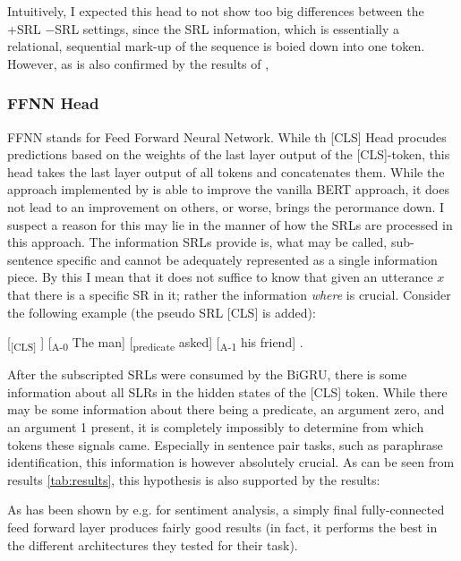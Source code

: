 Intuitively, I expected this head to not show too big differences between the +SRL $-$SRL settings,
since the SRL information, which is essentially a relational, sequential mark-up of the sequence is
boied down into one token. However, as is also confirmed by the results of \cite{zhang2019semantics},


\subsubsection{FFNN Head}

FFNN stands for Feed Forward Neural Network. While th [CLS] Head procudes predictions based on the
weights of the last layer output of the [CLS]-token, this head takes the last layer output of all
tokens and concatenates them.
While the approach implemented by \cite{zhang2019semantics} is able to improve the vanilla
BERT approach, it does not lead to an improvement on others, or worse, brings the perormance
down. I suspect a reason for this may lie in the manner of how the SRLs are processed in this
approach. The information SRLs provide is, what may be called, sub-sentence specific and
cannot be adequately represented as a single information piece. By this I mean that it does
not suffice to know that given an utterance $x$ that there is a specific SR in it; rather the
information \emph{where} is crucial. Consider the following example (the pseudo SRL [CLS] is
added):


[\textsubscript{[CLS]} ] [\textsubscript{A-0} The man] [\textsubscript{predicate} asked] [\textsubscript{A-1} his friend] .

After the subscripted SRLs were consumed by the BiGRU, there is some information about all
SLRs in the hidden states of the [CLS] token. While there may be some information about there
being a predicate, an argument zero, and an argument 1 present, it is completely impossibly
to determine from which tokens these signals came. Especially in sentence pair tasks, such
as paraphrase identification, this information is however absolutely crucial. As can be seen
from results \ref{tab:results}, this hypothesis is also supported by the results:


As has been shown by e.g. \cite{myagmar2019transferable} for sentiment analysis, a simply final
fully-connected feed forward layer produces fairly good results (in fact, it performs the best
in the different architectures they tested for their task).

